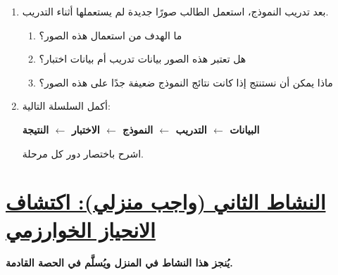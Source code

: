 \documentclass[a4paper]{article}
\begin{document}
\begin{enumerate}
\begin{enumerate}
    \item ما الذي يمكن اعتباره \textbf{بيانات التدريب}؟
    
    \item لماذا يجب أن تكون البيانات متنوعة وممثلة للحالات المختلفة؟
    
    \item ماذا يمكن أن يحدث إذا كانت أغلب الصور من نوع واحد فقط؟

\end{enumerate}


\item بعد تدريب النموذج، استعمل الطالب صورًا جديدة لم يستعملها
أثناء التدريب.

\begin{enumerate}

    \item ما الهدف من استعمال هذه الصور؟
    
    \item هل تعتبر هذه الصور بيانات تدريب أم بيانات اختبار؟
    
    \item ماذا يمكن أن نستنتج إذا كانت نتائج النموذج ضعيفة جدًا
    على هذه الصور؟

\end{enumerate}


\item أكمل السلسلة التالية:

\begin{center}

\textbf{
البيانات
$\leftarrow$
التدريب
$\leftarrow$
النموذج
$\leftarrow$
الاختبار
$\leftarrow$
النتيجة
}

\end{center}

اشرح باختصار دور كل مرحلة.

\end{enumerate}


\section*{\khatt\underline{النشاط الثاني (واجب منزلي): اكتشاف الانحياز الخوارزمي}}

\textbf{يُنجز هذا النشاط في المنزل ويُسلَّم في الحصة القادمة.}
\end{document}
